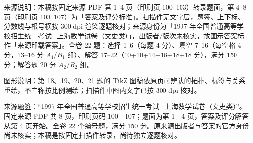

\begin{gktip}
来源说明：本稿按固定来源 PDF 第 1–4 页（印刷页 100–103）转录题面，第 4–8 页（印刷页 103–107）为「答案及评分标准」。扫描件无文字层，题签、上下标、分数线与根号横按 300 dpi 渲染逐题核对；来源身份为「1997 年全国普通高等学校招生统一考试·上海数学试卷（文史类）」，出版者/版次未核实，故图示答案标作「来源印载答案」。全卷 22 题：选择 1–6（每题 4 分）、填空 7–16（每空格 4 分，13–16 分 $A_1$/$B_1$ 组）、解答 17–22（10+10+14+16+18+18 分），满分 150 分；解答题 20 分 $A_2$/$B_2$ 组。

图形说明：第 18、19、20、21 题的 TikZ 图稿依原页可辨认的拓扑、标签与关系重绘，不宣称按比例测绘；扫描件中图内文字已按 300 dpi 核对。
\end{gktip}

来源题签：“1997 年全国普通高等学校招生统一考试·上海数学试卷（文史类）”。固定来源 PDF 共 8 页，印刷页码 100—107；题面为第 1—4 页，答案及评分解答从第 4 页开始。全卷 22 个编号题，满分 150 分。原来源出版者与答案的官方身份尚未核实；本稿是按固定扫描件转录，尚待独立逐题核对。


